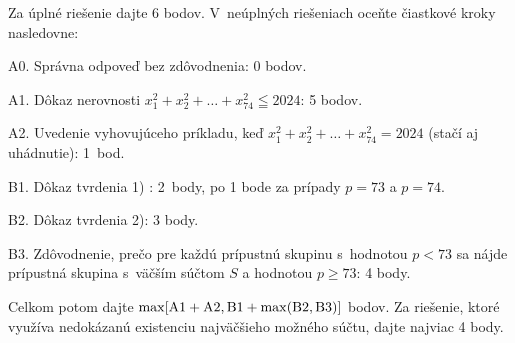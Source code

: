 {\schemaABC
Za úplné riešenie dajte 6 bodov. V~neúplných riešeniach oceňte čiastkové
kroky nasledovne:
\item{A0.} Správna odpoveď bez zdôvodnenia: 0 bodov.
\item{A1.} Dôkaz nerovnosti $x_1^2+x_2^2+\dots+x_{74}^2\leqq2024$: 5 bodov.
\item{A2.} Uvedenie vyhovujúceho príkladu, keď $x_1^2+x_2^2+\dots+x_{74}^2=2024$ (stačí aj uhádnutie): 1~bod.
\item{B1.} Dôkaz tvrdenia 1) : 2~body, po 1 bode za prípady $p=73$ a $p=74$.
\item{B2.} Dôkaz tvrdenia 2): 3 body.
\item{B3.} Zdôvodnenie, prečo pre každú prípustnú skupinu s~hodnotou $p<73$ sa nájde prípustná skupina s~väčším súčtom $S$ a hodnotou $p\geq73$: 4 body.

\noindent
Celkom potom dajte $\rm\max[A1+A2,B1+\max(B2,B3)]$ bodov. Za
riešenie, ktoré využíva nedokázanú existenciu najväčšieho možného
súčtu, dajte najviac 4 body.
\endschema
}

